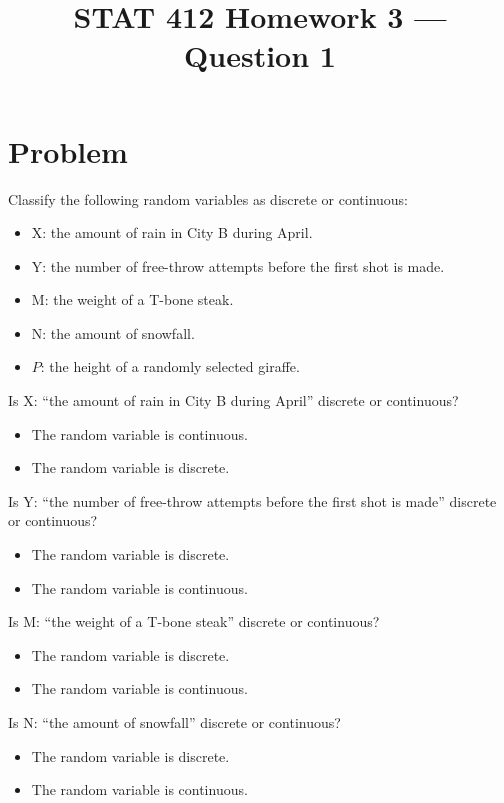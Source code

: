 \documentclass[11pt]{article}
\title{STAT 412 Homework 3 --- Question 1}
\author{}
\date{}
\begin{document}
\maketitle

\section*{Problem}
Classify the following random variables as discrete or continuous:
\begin{itemize}
\item X: the amount of rain in City B during April.
\item Y: the number of free-throw attempts before the first shot is made.
\item M: the weight of a T-bone steak.
\item N: the amount of snowfall.
\item $P$: the height of a randomly selected giraffe.
\end{itemize}

Is X: ``the amount of rain in City B during April'' discrete or continuous?
\begin{itemize}
\item The random variable is continuous.
\item The random variable is discrete.
\end{itemize}

\noindent
Is Y: ``the number of free-throw attempts before the first shot is made''
discrete or continuous?
\begin{itemize}
\item The random variable is discrete.
\item The random variable is continuous.
\end{itemize}

\noindent
Is M: ``the weight of a T-bone steak'' discrete or continuous?
\begin{itemize}
\item The random variable is discrete.
\item The random variable is continuous.
\end{itemize}

\noindent
Is N: ``the amount of snowfall'' discrete or continuous?
\begin{itemize}
\item The random variable is discrete.
\item The random variable is continuous.
\end{itemize}
\end{document}
